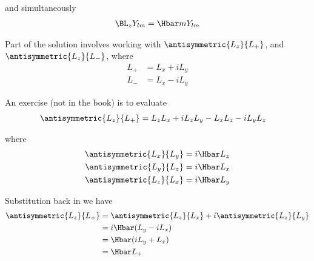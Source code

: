 and simultaneously
%
\begin{equation}\label{eqn:lecture5BigReviewAngularMomentum:5320}
\begin{aligned}
\BL_z Y_{lm} = \Hbar m Y_{lm}
\end{aligned}
\end{equation}

Part of the solution involves working with \(\antisymmetric{L_z}{L_{+}}\), and \(\antisymmetric{L_z}{L_{-}}\), where
%
\begin{equation}\label{eqn:lecture5BigReviewAngularMomentum:5340}
\begin{aligned}
L_{+} &= L_x + i L_y \\
L_{-} &= L_x - i L_y
\end{aligned}
\end{equation}

An exercise (not in the book) is to evaluate
\begin{equation}\label{eqn:PHY356F:4000}
\begin{aligned}
\antisymmetric{L_z}{L_{+}}
&= L_z L_x + i L_z L_y - L_x L_z - i L_y L_z
\end{aligned}
\end{equation}

where
\begin{equation}\label{eqn:PHY356F:5000}
\begin{aligned}
\antisymmetric{L_x}{L_y}  &= i \Hbar L_z \\
\antisymmetric{L_y}{L_z}  &= i \Hbar L_x \\
\antisymmetric{L_z}{L_x}  &= i \Hbar L_y
\end{aligned}
\end{equation}

Substitution back in  we have
%
\begin{equation}\label{eqn:lecture5BigReviewAngularMomentum:5360}
\begin{aligned}
\antisymmetric{L_z}{L_{+}}
&=
\antisymmetric{L_z}{L_x}
+ i \antisymmetric{L_z}{L_y}  \\
&=
i \Hbar ( L_y - i L_x ) \\
&=
\Hbar ( i L_y +  L_x ) \\
&=
\Hbar L_{+}
\end{aligned}
\end{equation}
